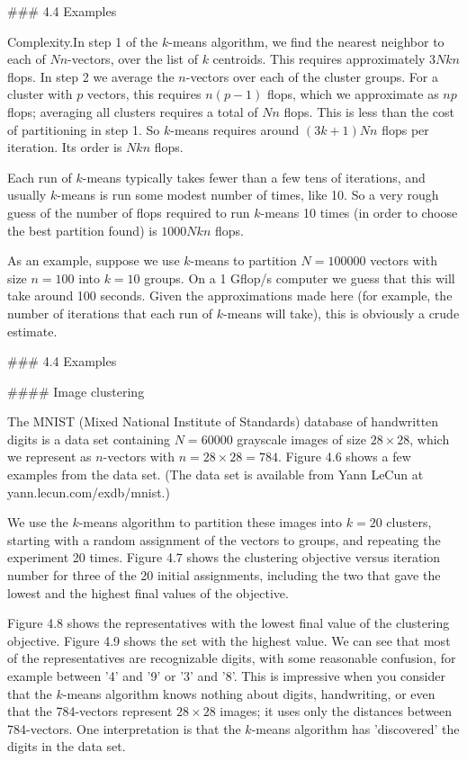 

### 4.4 Examples

Complexity.In step 1 of the \(k\)-means algorithm, we find the nearest neighbor to each of \(N\)\(n\)-vectors, over the list of \(k\) centroids. This requires approximately \(3Nkn\) flops. In step 2 we average the \(n\)-vectors over each of the cluster groups. For a cluster with \(p\) vectors, this requires \(n(p-1)\) flops, which we approximate as \(np\) flops; averaging all clusters requires a total of \(Nn\) flops. This is less than the cost of partitioning in step 1. So \(k\)-means requires around \((3k+1)Nn\) flops per iteration. Its order is \(Nkn\) flops.

Each run of \(k\)-means typically takes fewer than a few tens of iterations, and usually \(k\)-means is run some modest number of times, like 10. So a very rough guess of the number of flops required to run \(k\)-means 10 times (in order to choose the best partition found) is \(1000Nkn\) flops.

As an example, suppose we use \(k\)-means to partition \(N=100000\) vectors with size \(n=100\) into \(k=10\) groups. On a 1 Gflop/s computer we guess that this will take around 100 seconds. Given the approximations made here (for example, the number of iterations that each run of \(k\)-means will take), this is obviously a crude estimate.

### 4.4 Examples

#### Image clustering

The MNIST (Mixed National Institute of Standards) database of handwritten digits is a data set containing \(N=60000\) grayscale images of size \(28\times 28\), which we represent as \(n\)-vectors with \(n=28\times 28=784\). Figure 4.6 shows a few examples from the data set. (The data set is available from Yann LeCun at yann.lecun.com/exdb/mnist.)

We use the \(k\)-means algorithm to partition these images into \(k=20\) clusters, starting with a random assignment of the vectors to groups, and repeating the experiment 20 times. Figure 4.7 shows the clustering objective versus iteration number for three of the 20 initial assignments, including the two that gave the lowest and the highest final values of the objective.

Figure 4.8 shows the representatives with the lowest final value of the clustering objective. Figure 4.9 shows the set with the highest value. We can see that most of the representatives are recognizable digits, with some reasonable confusion, for example between '4' and '9' or '3' and '8'. This is impressive when you consider that the \(k\)-means algorithm knows nothing about digits, handwriting, or even that the 784-vectors represent \(28\times 28\) images; it uses only the distances between 784-vectors. One interpretation is that the \(k\)-means algorithm has 'discovered' the digits in the data set.

